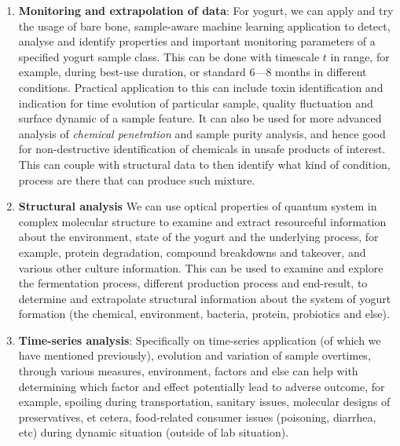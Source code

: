 \documentclass{iopjournal}
\begin{document}
\begin{enumerate}[topsep=1pt, itemsep = 2pt]
  \item \textbf{Monitoring and extrapolation of data}: For yogurt, we can apply and try the usage of bare bone, sample-aware machine learning application to detect, analyse and identify properties and important monitoring parameters of a specified yogurt sample class. This can be done with timescale $t$ in range, for example, during best-use duration, or standard 6---8 months in different conditions. Practical application to this can include toxin identification and indication for time evolution of particular sample, quality fluctuation and surface dynamic of a sample feature. It can also be used for more advanced analysis of \textit{chemical penetration} and sample purity analysis, and hence good for non-destructive identification of chemicals in unsafe products of interest. This can couple with structural data to then identify what kind of condition, process are there that can produce such mixture. 
  \item \textbf{Structural analysis} We can use optical properties of quantum system in complex molecular structure to examine and extract resourceful information about the environment, state of the yogurt and the underlying process, for example, protein degradation, compound breakdowns and takeover, and various other culture information. This can be used to examine and explore the fermentation process, different production process and end-result, to determine and extrapolate structural information about the system of yogurt formation (the chemical, environment, bacteria, protein, probiotics and else). 
  \item \textbf{Time-series analysis}: Specifically on time-series application (of which we have mentioned previously), evolution and variation of sample overtimes, through various measures, environment, factors and else can help with determining which factor and effect potentially lead to adverse outcome, for example, spoiling during transportation, sanitary issues, molecular designs of preservatives, et cetera, food-related consumer issues (poisoning, diarrhea, etc) during dynamic situation (outside of lab situation). 
\end{enumerate}
\end{document}
